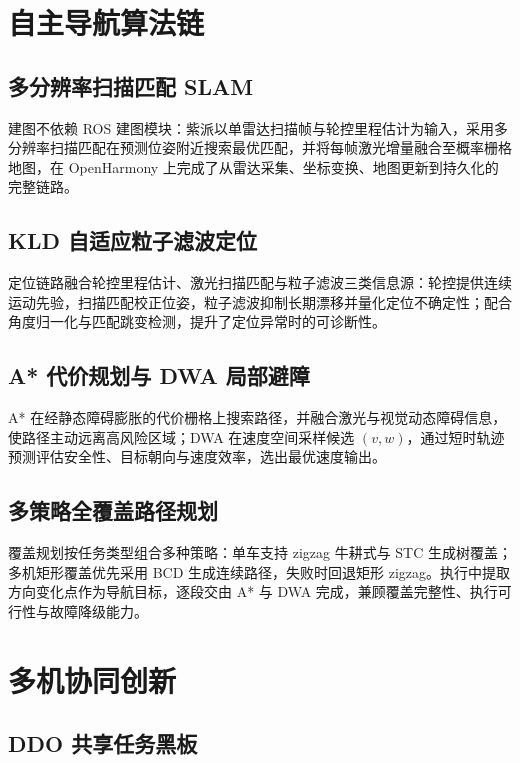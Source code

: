 \section{自主导航算法链}
\label{sec:algorithm-innovations}

\subsection{多分辨率扫描匹配 SLAM}
\label{sec:self-slam}

建图不依赖 ROS 建图模块：紫派以单雷达扫描帧与轮控里程估计为输入，采用多分辨率扫描匹配在预测位姿附近搜索最优匹配，并将每帧激光增量融合至概率栅格地图，在 OpenHarmony 上完成了从雷达采集、坐标变换、地图更新到持久化的完整链路。

\subsection{KLD 自适应粒子滤波定位}
\label{sec:self-localization}

定位链路融合轮控里程估计、激光扫描匹配与粒子滤波三类信息源：轮控提供连续运动先验，扫描匹配校正位姿，粒子滤波抑制长期漂移并量化定位不确定性；配合角度归一化与匹配跳变检测，提升了定位异常时的可诊断性。

\subsection{A* 代价规划与 DWA 局部避障}
\label{sec:self-planning}

A* 在经静态障碍膨胀的代价栅格上搜索路径，并融合激光与视觉动态障碍信息，使路径主动远离高风险区域；DWA 在速度空间采样候选 $(v,w)$，通过短时轨迹预测评估安全性、目标朝向与速度效率，选出最优速度输出。

\subsection{多策略全覆盖路径规划}
\label{sec:self-coverage}

覆盖规划按任务类型组合多种策略：单车支持 zigzag 牛耕式与 STC 生成树覆盖；多机矩形覆盖优先采用 BCD 生成连续路径，失败时回退矩形 zigzag。执行中提取方向变化点作为导航目标，逐段交由 A* 与 DWA 完成，兼顾覆盖完整性、执行可行性与故障降级能力。

\section{多机协同创新}
\label{sec:multi-robot-innovations}

\subsection{DDO 共享任务黑板}
\label{sec:ddo-paradigm}

